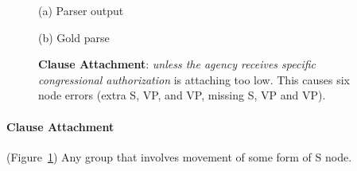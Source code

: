 \begin{figure}
\begin{center}

\vspace{3mm}
(a) Parser output

\vspace{6mm}


\vspace{3mm}
(b) Gold parse
\end{center}
\derivspace
\caption[Error analysis example: clause attachment.]{ \label{fig:clause-attachment} 
	\textbf{Clause Attachment}: \emph{unless the agency receives specific
	congressional authorization} is attaching too low. This causes six
	node errors (extra S, VP, and VP, missing S, VP and VP).
}
\derivaftercompress
\end{figure}

\paragraph{Clause Attachment} (Figure~\ref{fig:clause-attachment}) 
Any group that involves movement of some form of S node.

